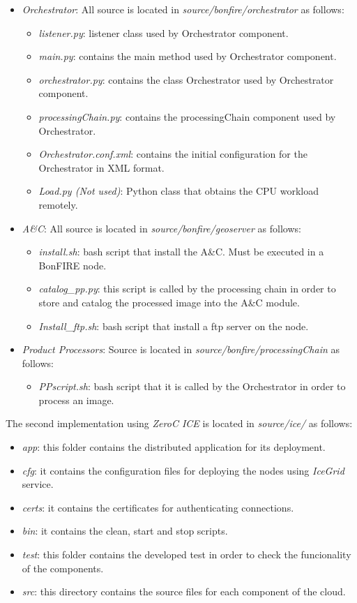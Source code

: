 \begin{itemize}
\item \emph{Orchestrator}: All source is located in \emph{source/bonfire/orchestrator} as follows:
\begin{itemize}
\item \emph{listener.py}: listener class used by Orchestrator component.
\item \emph{main.py}: contains the main method used by Orchestrator component.
\item \emph{orchestrator.py}: contains the class Orchestrator used by Orchestrator component.
\item \emph{processingChain.py}: contains the processingChain component used by Orchestrator.
\item \emph{Orchestrator.conf.xml}: contains the initial configuration for the Orchestrator in \ac{XML} format.
\item \emph{Load.py (Not used)}: Python class that obtains the CPU workload
  remotely.  
\end{itemize}
\item \emph{A\&C}: All source is located in \emph{source/bonfire/geoserver} as
  follows:
\begin{itemize}
\item \emph{install.sh}: bash script that install the A\&C. Must be executed in a BonFIRE node.
\item \emph{catalog\_pp.py}: this script is called by the processing chain in order to store and catalog the processed image into the A\&C module.
\item \emph{Install\_ftp.sh}: bash script that install a ftp server on the node.
\end{itemize}
\item \emph{Product Processors}: Source is located in \emph{source/bonfire/processingChain} as follows:
\begin{itemize}
\item \emph{PPscript.sh}: bash script that it is called by the Orchestrator in
  order to process an image. 
\end{itemize}
\end{itemize}

The second implementation using \emph{ZeroC ICE} is located in
\emph{source/ice/} as follows:

\begin{itemize}

\item \emph{app}: this folder contains the distributed application for its
  deployment.
\item \emph{cfg}: it contains the configuration files for deploying the nodes
  using \emph{IceGrid} service.
\item \emph{certs}: it contains the certificates for authenticating connections.
\item \emph{bin}: it contains the clean, start and stop scripts.
\item \emph{test}: this folder contains the developed test in order to check the
  funcionality of the components.
\item \emph{src}: this directory contains the source files for each component of
  the cloud.
\end{itemize}

